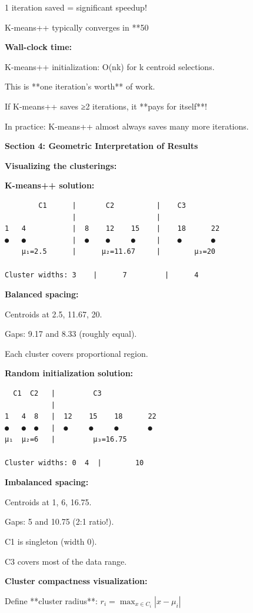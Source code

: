 \documentclass[12pt]{article}
\begin{document}
\begin{explanation}
1 iteration saved = significant speedup!

K-means++ typically converges in **50%

\textbf{Wall-clock time:}

K-means++ initialization: O(nk) for k centroid selections.

This is **one iteration's worth** of work.

If K-means++ saves ≥2 iterations, it **pays for itself**!

In practice: K-means++ almost always saves many more iterations.

\textbf{Section 4: Geometric Interpretation of Results}

\textbf{Visualizing the clusterings:}

\textbf{K-means++ solution:}

\begin{verbatim}
        C1      |       C2          |    C3
                |                   |
1   4           |  8    12    15    |    18      22
●   ●           |  ●    ●     ●     |    ●       ●
    μ₁=2.5      |      μ₂=11.67     |        μ₃=20

Cluster widths: 3    |      7         |      4
\end{verbatim}

\textbf{Balanced spacing:}

Centroids at 2.5, 11.67, 20.

Gaps: 9.17 and 8.33 (roughly equal).

Each cluster covers proportional region.

\textbf{Random initialization solution:}

\begin{verbatim}
  C1  C2   |         C3
           |
1   4  8   |  12    15    18      22
●   ●  ●   |  ●     ●     ●       ●
μ₁  μ₂=6   |         μ₃=16.75

Cluster widths: 0  4  |        10
\end{verbatim}

\textbf{Imbalanced spacing:}

Centroids at 1, 6, 16.75.

Gaps: 5 and 10.75 (2:1 ratio!).

C1 is singleton (width 0).

C3 covers most of the data range.

\textbf{Cluster compactness visualization:}

Define **cluster radius**: $r_i = \max_{x \in C_i} |x - \mu_i|$


\end{explanation}
\end{document}
